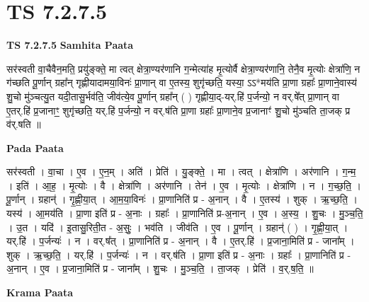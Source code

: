 \documentclass[17pt]{extarticle}
\begin{document}
\section{ TS 7.2.7.5 }

\textbf{TS 7.2.7.5 } \newline
\textbf{Samhita Paata} \newline

सर॑स्वती वा॒चैवैन॒मति॒ प्रयु॑ङ्क्ते॒ मा त्वत् क्षेत्रा॒ण्यर॑णानि ग॒न्मेत्या॑ह मृ॒त्योर्वै क्षेत्रा॒ण्यर॑णानि॒ तेनै॒व मृ॒त्योः क्षेत्रा॑णि॒ न ग॑च्छति पू॒र्णान् ग्रहा᳚न् गृह्णीयादामया॒विनः॑ प्रा॒णान् वा ए॒तस्य॒ शुगृ॑च्छति॒ यस्या॒ ऽऽ*मय॑ति प्रा॒णा ग्रहाः᳚ प्रा॒णाने॒वास्य॑ शु॒चो मु॑ञ्चत्यु॒त यदी॒तासु॒र्भव॑ति॒ जीव॑त्ये॒व पू॒र्णान् ग्रहा᳚न् ( ) गृह्णीया॒द्-यर्.हि॑ प॒र्जन्यो॒ न वर्.षे᳚त् प्रा॒णान् वा ए॒तर्.हि॑ प्र॒जानाꣳ॒॒ शुगृ॑च्छति॒ यर्.हि॑ प॒र्जन्यो॒ न वर्.ष॑ति प्रा॒णा ग्रहाः᳚ प्रा॒णाने॒व प्र॒जानाꣳ॑ शु॒चो मु॑ञ्चति ता॒जक् प्र व॑र्.षति ॥ \newline

\textbf{Pada Paata} \newline

सर॑स्वती । वा॒चा । ए॒व । ए॒न॒म् । अति॑ । प्रेति॑ । यु॒ङ्क्ते॒ । मा । त्वत् । क्षेत्रा॑णि । अर॑णानि । ग॒न्म॒ । इति॑ । आ॒ह॒ । मृ॒त्योः । वै । क्षेत्रा॑णि । अर॑णानि । तेन॑ । ए॒व । मृ॒त्योः । क्षेत्रा॑णि । न । ग॒च्छ॒ति॒ । पू॒र्णान् । ग्रहान्॑ । गृ॒ह्णी॒या॒त् । आ॒म॒या॒विनः॑ । प्रा॒णानिति॑ प्र - अ॒नान् । वै । ए॒तस्य॑ । शुक् । ऋ॒च्छ॒ति॒ । यस्य॑ । आ॒मय॑ति । प्रा॒णा इति॑ प्र - अ॒नाः । ग्रहाः᳚ । प्रा॒णानिति॑ प्र-अ॒नान् । ए॒व । अ॒स्य॒ । शु॒चः । मु॒ञ्च॒ति॒ । उ॒त । यदि॑ । इ॒तासु॒रिती॒त - अ॒सुः॒ । भव॑ति । जीव॑ति । ए॒व । पू॒र्णान् । ग्रहान्॑ ( ) । गृ॒ह्णी॒या॒त् । यर्.हि॑ । प॒र्जन्यः॑ । न । वर्.ष᳚त् । प्रा॒णानिति॑ प्र - अ॒नान् । वै । ए॒तर्.हि॑ । प्र॒जाना॒मिति॑ प्र - जाना᳚म् । शुक् । ऋ॒च्छ॒ति॒ । यर्.हि॑ । प॒र्जन्यः॑ । न । वर्.ष॑ति । प्रा॒णा इति॑ प्र - अ॒नाः । ग्रहाः᳚ । प्रा॒णानिति॑ प्र - अ॒नान् । ए॒व । प्र॒जाना॒मिति॑ प्र - जाना᳚म् । शु॒चः । मु॒ञ्च॒ति॒ । ता॒जक् । प्रेति॑ । व॒र्.ष॒ति॒ ॥  \newline


\textbf{Krama Paata} \newline
\end{document}
